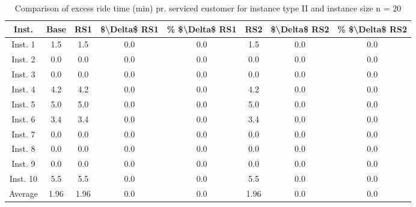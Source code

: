 \begin{table}[H]
\centering
\begin{tabular}{cccccccc}
  \hline
  \textbf{Inst.} & \textbf{Base} & \textbf{RS1} & \textbf{\$\textbackslash{}Delta\$  RS1} & \textbf{\% \$\textbackslash{}Delta\$  RS1} & \textbf{RS2} & \textbf{\$\textbackslash{}Delta\$  RS2} & \textbf{\% \$\textbackslash{}Delta\$  RS2} \\\hline
  Inst. 1 & 1.5 & 1.5 & 0.0 & 0.0 & 1.5 & 0.0 & 0.0 \\
  Inst. 2 & 0.0 & 0.0 & 0.0 & 0.0 & 0.0 & 0.0 & 0.0 \\
  Inst. 3 & 0.0 & 0.0 & 0.0 & 0.0 & 0.0 & 0.0 & 0.0 \\
  Inst. 4 & 4.2 & 4.2 & 0.0 & 0.0 & 4.2 & 0.0 & 0.0 \\
  Inst. 5 & 5.0 & 5.0 & 0.0 & 0.0 & 5.0 & 0.0 & 0.0 \\
  Inst. 6 & 3.4 & 3.4 & 0.0 & 0.0 & 3.4 & 0.0 & 0.0 \\
  Inst. 7 & 0.0 & 0.0 & 0.0 & 0.0 & 0.0 & 0.0 & 0.0 \\
  Inst. 8 & 0.0 & 0.0 & 0.0 & 0.0 & 0.0 & 0.0 & 0.0 \\
  Inst. 9 & 0.0 & 0.0 & 0.0 & 0.0 & 0.0 & 0.0 & 0.0 \\
  Inst. 10 & 5.5 & 5.5 & 0.0 & 0.0 & 5.5 & 0.0 & 0.0 \\
  Average & 1.96 & 1.96 & 0.0 & 0.0 & 1.96 & 0.0 & 0.0 \\\hline
\end{tabular}
\caption{Comparison of excess ride time (min) pr. serviced customer for instance type II and instance size n = 20}
\label{tab:wait:resrelocation-excess-ride-time-comparison_II_20}
\end{table}
